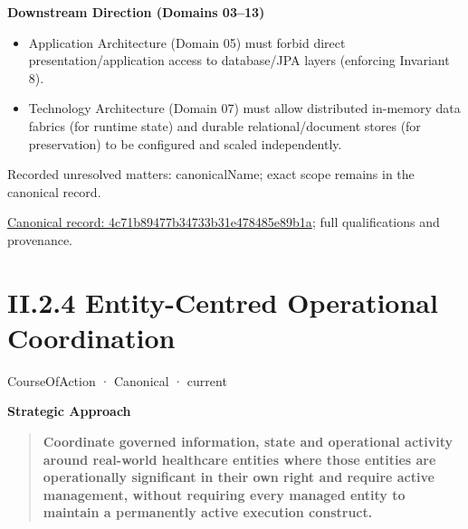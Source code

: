 \par\medskip\textbf{Downstream Direction (Domains 03–13)}\par


\begin{itemize}


\item Application Architecture (Domain 05) must forbid direct presentation/application access to database/JPA layers (enforcing Invariant 8).

\item Technology Architecture (Domain 07) must allow distributed in-memory data fabrics (for runtime state) and durable relational/document stores (for preservation) to be configured and scaled independently.

\end{itemize}

{\small Recorded unresolved matters: canonicalName; exact scope remains in the canonical record.}\par
{\footnotesize \href{../../../../continuum/strategy/course-of-action/4c71b89477b34733b31e478485e89b1a.md}{Canonical record: 4c71b89477b34733b31e478485e89b1a}; full qualifications and provenance.}\par
\section*{II.2.4 Entity-Centred Operational Coordination}
\label{navigation:II.2.4}

\label{element:f601fe1f39a3447f8e9fb2cc4ffe9dee}
{\small CourseOfAction · Canonical · current}\par

\par\medskip\textbf{Strategic Approach}\par


\begin{quote}


\textbf{Coordinate governed information, state and operational activity around real-world healthcare entities where those entities are operationally significant in their own right and require active management, without requiring every managed entity to maintain a permanently active execution construct.}



\end{quote}


